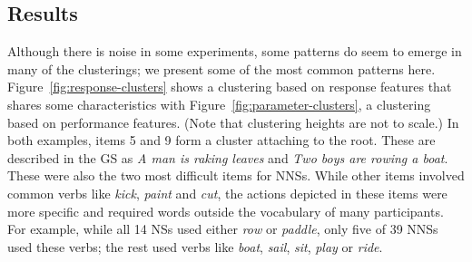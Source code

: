 \documentclass[11pt,letterpaper]{article}
\renewcommand{\marginpar}[1]{}
\begin{document}


\subsection{Results}
\label{sec:clusteringresults}

Although there is noise in some experiments, some patterns do seem to
emerge in many of the clusterings; we present some of the most common
patterns here.
%
Figure~\ref{fig:response-clusters} shows a clustering based on
response features that shares some characteristics with
Figure~\ref{fig:parameter-clusters}, a clustering based on performance
features. (Note that clustering heights are not to scale.)  In both
examples, items 5 and 9 form a cluster attaching to the root. These
are described in the GS as \textit{A man is raking leaves} and
\textit{Two boys are rowing a boat}. These were also the two most
difficult items for NNSs. While other items involved common verbs like
\textit{kick}, \textit{paint} and \textit{cut}, the actions depicted
in these items were more specific and required words outside the
vocabulary of many participants. For example, while all 14 NSs used
either \textit{row} or \textit{paddle}, only five of 39 NNSs used
these verbs; the rest used verbs like \textit{boat}, \textit{sail},
\textit{sit}, \textit{play} or \textit{ride}.
\end{document}
